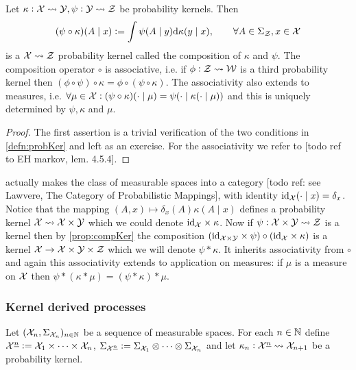 \documentclass{article}
\begin{document}
\begin{prop}
  Let $\kappa : \mathcal{X} \leadsto \mathcal{Y}, \psi : \mathcal{Y} \leadsto \mathcal{Z}$
  be probability kernels. Then
  \[ (\psi \circ \kappa)(A \mid x) \vcentcolon=
    \int \psi(A \mid y) \mathrm{d} \kappa(y \mid x)
  ,\qquad \forall A \in \Sigma_{\mathcal{Z}}, x \in \mathcal{X} \]
  is a $\mathcal{X} \leadsto \mathcal{Z}$ probability kernel called the
  composition of $\kappa$ and $\psi$. The composition operator
  $\circ$ is associative, i.e. if $\phi : \mathcal{Z} \leadsto \mathcal{W}$ is
  a third probability kernel then $(\phi \circ \psi) \circ \kappa = 
  \phi \circ (\psi \circ \kappa)$.
  The associativity also extends to measures, i.e.
  $\forall \mu \in \mathcal{X}
  : (\psi \circ \kappa)(\cdot \mid \mu) = \psi(\cdot \mid \kappa(\cdot \mid \mu)) $
  and this is uniquely determined by $\psi, \kappa$ and $\mu$.
  \label{prop:compKer}
\end{prop}
\begin{proof}
  The first assertion is a trivial verification of the two conditions
  in \cref{defn:probKer} and left as an exercise.
  For the associativity we refer to [todo ref to EH markov, lem. 4.5.4].
\end{proof}

 actually makes the class of measurable spaces
into a category [todo ref: see Lawvere, The Category of Probabilistic
Mappings], with identity $\text{id}_{\mathcal{X}}(\cdot \mid x) = \delta_x$.
Notice that the mapping $(A, x) \mapsto \delta_x(A) \kappa(A \mid x)$
defines a probability kernel $\mathcal{X} \leadsto \mathcal{X} \times \mathcal{Y}$
which we could denote $\text{id}_{\mathcal{X}} \times \kappa$.
Now if $\psi : \mathcal{X} \times \mathcal{Y} \leadsto \mathcal{Z}$ is a kernel
then by \cref{prop:compKer} the composition
$(\text{id}_{\mathcal{X} \times \mathcal{Y}} \times \psi)
\circ (\text{id}_{\mathcal{X}} \times \kappa)$
is a kernel $\mathcal{X} \to \mathcal{X} \times \mathcal{Y} \times \mathcal{Z}$
which we will denote $\psi * \kappa$.
It inherits associativity from $\circ$ and again this associativity
extends to application on measures: if $\mu$ is a measure on $\mathcal{X}$
then $\psi * (\kappa * \mu) = (\psi * \kappa) * \mu$.

\subsubsection{Kernel derived processes}

Let $(\mathcal{X}_n, \Sigma_{\mathcal{X}_n})_{n \in \mathbb{N}}$ be a sequence
of measurable spaces. For each $n \in \mathbb{N}$ define
$\mathcal{X}^{\underline{n}} \vcentcolon= \mathcal{X}_1 \times \dots \times \mathcal{X}_n$,
$\Sigma_{\mathcal{X}^{\underline{n}}} \vcentcolon= \Sigma_{\mathcal{X}_1} \otimes
\dots \otimes \Sigma_{\mathcal{X}_n}$
and let
$\kappa_n : \mathcal{X}^{\underline{n}} \leadsto \mathcal{X}_{n+1}$ be a probability kernel.
\end{document}
